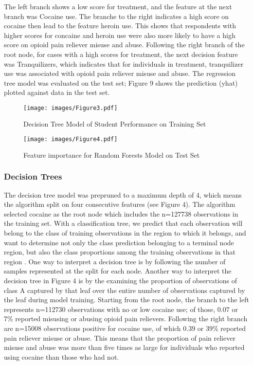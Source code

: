 \documentclass[sigconf]{acmart}
\begin{document}
The left branch shows a low 
score for treatment, and the feature at the next branch was Cocaine use. 
The branche to the right indicates a high score on cocaine then lead to 
the feature heroin use. This shows that respondents with higher scores for 
concaine and heroin use were also more likely to have a high score on 
opioid pain reliever misuse and abuse. Following the right branch of the 
root node, for cases with a high scores for treatment, the next decision 
feature was Tranquilizers, which indicates that for individuals in treatment, 
tranquilizer use was associated with opioid pain reliever misuse and abuse. 
The regression tree model was evaluated on the test set; Figure 9 shows 
the prediction (yhat) plotted against data in the test set.


\begin{figure}[!ht]
  \centering\texttt{[image: images/Figure3.pdf]}
  \caption{Decision Tree Model of Student Performance on Training Set}
  \label{f:Figure3}
\end{figure}

\begin{figure}[!ht]
  \centering\texttt{[image: images/Figure4.pdf]}
  \caption{Feature importance for Random Forests Model on Test Set}
  \label{f:Figure4}
\end{figure}







\subsubsection{Decision Trees} 

The decision tree model was prepruned to a maximum depth of 4, which means 
the algorithm split on four consecutive features (see Figure 4). The  
algorithm selected cocaine as the root node which includes the n=127738 
observations in the training set. With a classification tree, we predict 
that each observation will belong to the class of training observations in 
the region to which it belongs, and want to determine not only the class
prediction belonging to a terminal node region, but also the class 
proportions among the training observations in that region \cite{james13}. 
One way to interpret a decision tree is by following the number of samples 
represented at the split for each node. Another way to interpret the decision 
tree in Figure 4 is by the examining the proportion of observations of 
class A captured by that leaf over the entire number of observations captured 
by the leaf during model training. Starting from the root node, the branch 
to the left represents n=112730 observations with no or low cocaine use; 
of those, 0.07 or 7\% reported misusing or abusing opioid pain relievers. 
Following the right branch are n=15008 observations positive for cocaine use, 
of which 0.39 or 39\% reported pain reliever misuse or abuse. This means that 
the proportion of pain reliever misuse and abuse was more than five times as 
large for individuals who reported using cocaine than those who had not. 
\end{document}
